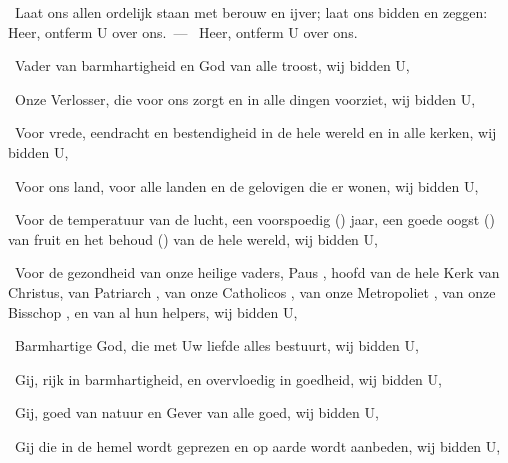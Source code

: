 \documentclass[12pt,twoside,a5paper]{article}
\begin{document}
\begin{halfparskip}
  \dd~Laat ons allen ordelijk staan met berouw en ijver; laat ons bidden en zeggen: Heer, ontferm U over ons.~--- \rr~Heer, ontferm U over ons. 

  \dd~Vader van barmhartigheid en God van alle troost, wij bidden U,

  \dd~Onze Verlosser, die voor ons zorgt en in alle dingen voorziet, wij bidden U,

  \dd~Voor vrede, eendracht en bestendigheid in de hele wereld en in alle kerken, wij bidden U,

  \dd~Voor ons land, voor alle landen en de gelovigen die er wonen, wij bidden U,

  \dd~Voor de temperatuur van de lucht, een voorspoedig () jaar, een goede oogst () van fruit en het behoud () van de hele wereld, wij bidden U,

  \dd~Voor de gezondheid van onze heilige vaders, Paus \NN , hoofd van de hele Kerk van Christus, van Patriarch \NN , van onze Catholicos \NN , van onze Metropoliet \NN , van onze Bisschop \NN , en van al hun helpers, wij bidden U,


  \dd~Barmhartige God, die met Uw liefde alles bestuurt, wij bidden U,


  \dd~Gij, rijk in barmhartigheid, en overvloedig in goedheid, wij bidden U,


  \dd~Gij, goed van natuur en Gever van alle goed, wij bidden U,


  \dd~Gij die in de hemel wordt geprezen en op aarde wordt aanbeden, wij bidden U,


\end{halfparskip}
\end{document}
